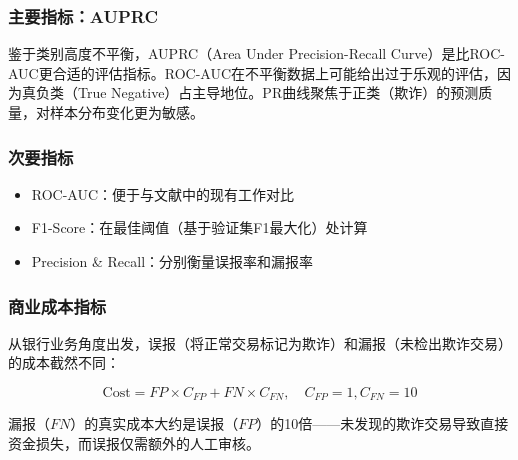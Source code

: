 \subsubsection{主要指标：AUPRC}

鉴于类别高度不平衡，AUPRC（Area Under Precision-Recall Curve）是比ROC-AUC更合适的评估指标\cite{saito2015precision}。ROC-AUC在不平衡数据上可能给出过于乐观的评估，因为真负类（True Negative）占主导地位。PR曲线聚焦于正类（欺诈）的预测质量，对样本分布变化更为敏感。

\subsubsection{次要指标}

\begin{itemize}
    \item ROC-AUC：便于与文献中的现有工作对比
    \item F1-Score：在最佳阈值（基于验证集F1最大化）处计算
    \item Precision \& Recall：分别衡量误报率和漏报率
\end{itemize}

\subsubsection{商业成本指标}

从银行业务角度出发，误报（将正常交易标记为欺诈）和漏报（未检出欺诈交易）的成本截然不同：

\begin{equation}
\text{Cost} = FP \times C_{FP} + FN \times C_{FN}, \quad C_{FP}=1, C_{FN}=10
\end{equation}

漏报（$FN$）的真实成本大约是误报（$FP$）的10倍——未发现的欺诈交易导致直接资金损失，而误报仅需额外的人工审核。
